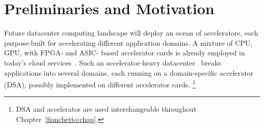 \section{Preliminaries and Motivation}%
\label{sec:motivation}

Future datacenter computing landscape will deploy an ocean of accelerators, each purpose-built for accelerating different 
application domains.
%
A mixture of CPU, GPU, with FPGA- and ASIC- based accelerator cards is already employed in today's cloud services~\cite{catapult:isca:2014, cloud-scale-acc:micro:2016, tpu:isca:2017, brainwave:isca:2018, aws-inferentia:2019,tpuv4i:isca:2021,google-vcu:asplos:2021, aws-trainium:2022}.
%
Such an accelerator-heavy datacenter~\cite{asic-cloud:isca:2016, asic-cloud:cacm:2020} breaks applications into several domains, each running on a domain-specific accelerator (DSA), possibly implemented on different accelerator cards. \footnote{DSA and accelerator are used interchangeable throughout Chapter~\ref{fianchetto:chap}.} %
%

